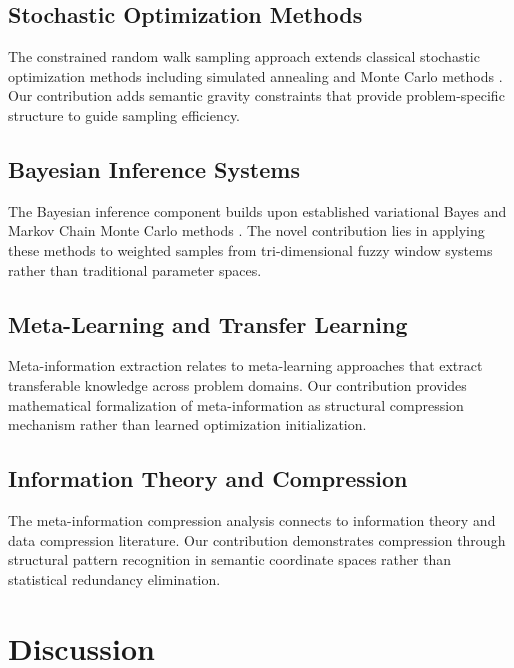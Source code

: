 \documentclass[12pt,a4paper]{article}
\begin{document}
\begin{table}[h]
\subsection{Stochastic Optimization Methods}

The constrained random walk sampling approach extends classical stochastic optimization methods including simulated annealing \cite{kirkpatrick1983optimization} and Monte Carlo methods \cite{metropolis1953equation}. Our contribution adds semantic gravity constraints that provide problem-specific structure to guide sampling efficiency.

\subsection{Bayesian Inference Systems}

The Bayesian inference component builds upon established variational Bayes \cite{jordan1999introduction} and Markov Chain Monte Carlo methods \cite{gilks1995markov}. The novel contribution lies in applying these methods to weighted samples from tri-dimensional fuzzy window systems rather than traditional parameter spaces.

\subsection{Meta-Learning and Transfer Learning}

Meta-information extraction relates to meta-learning approaches \cite{hospedales2021meta} that extract transferable knowledge across problem domains. Our contribution provides mathematical formalization of meta-information as structural compression mechanism rather than learned optimization initialization.

\subsection{Information Theory and Compression}

The meta-information compression analysis connects to information theory \cite{cover2006elements} and data compression literature. Our contribution demonstrates compression through structural pattern recognition in semantic coordinate spaces rather than statistical redundancy elimination.

\section{Discussion}


\end{table}
\end{document}
